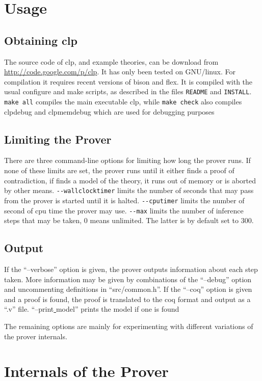 \documentclass[a4paper]{article}
\begin{document}
\section{Usage}
\subsection{Obtaining clp}
The source code of clp, and example theories, can be download from \url{http://code.google.com/p/clp}. It has only been tested on GNU/linux. For compilation it requires recent versions of bison and flex. It is compiled with the usual configure and make scripts, as described in the files \verb|README| and \verb|INSTALL|. \verb|make all| compiles the main executable clp, while \verb|make check| also compiles clpdebug and clpmemdebug which are used for debugging purposes


\subsection{Limiting the Prover}
There are three command-line options for limiting how long the prover runs. If none of these limits are set, the prover runs until it either finds a proof of contradiction, if finds a model of the theory, it runs out of memory or is aborted by other means. \verb|--wallclocktimer| limits the number of seconds that may pass from the prover is started until it is halted. \verb|--cputimer| limits the number of second of cpu time the prover may use. \verb|--max| limits the number of inference steps that may be taken, $0$ means unlimited. The latter is by default set to $300$.

\subsection{Output}
If the ``--verbose'' option is given, the prover outputs information about each step taken. More information may be given by combinations of the ``--debug'' option and uncommenting definitions in ``src/common.h''. 
If the ``--coq'' option is given and a proof is found, the proof is translated to the coq format and output as a ``.v'' file. ``--print\underline{ }model'' prints the model if one is found

The remaining options are mainly for experimenting with different variations of the prover internals. 
\section{Internals of the Prover}
\end{document}

